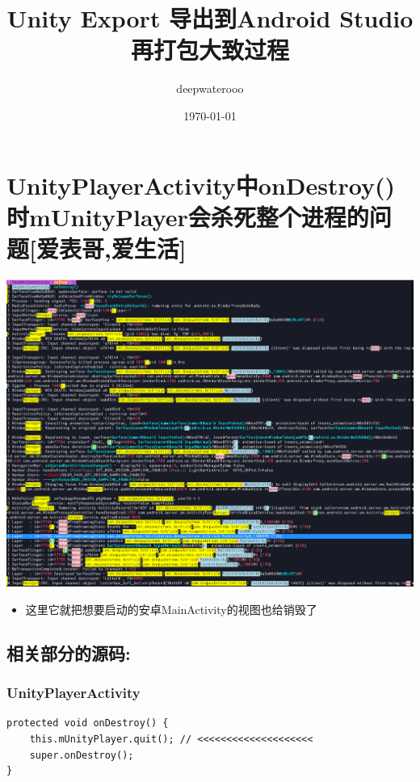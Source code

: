 \documentclass[9pt, b5paper]{article}
\author{deepwaterooo}
\date{\today}
\title{Unity Export 导出到Android Studio再打包大致过程}
\begin{document}
\maketitle
\tableofcontents


\section{UnityPlayerActivity中onDestroy()时mUnityPlayer会杀死整个进程的问题[爱表哥,爱生活]}
\label{sec-1}

\includegraphics[width=.9\linewidth]{./pic/unityToAndroid_20221208_092915.png}
\begin{itemize}
\item 这里它就把想要启动的安卓MainActivity的视图也给销毁了
\end{itemize}
\subsection{相关部分的源码:}
\label{sec-1-1}
\subsubsection{UnityPlayerActivity}
\label{sec-1-1-1}
\begin{verbatim}
protected void onDestroy() {
    this.mUnityPlayer.quit(); // <<<<<<<<<<<<<<<<<<<< 
    super.onDestroy();
}
\end{verbatim}
\end{document}
